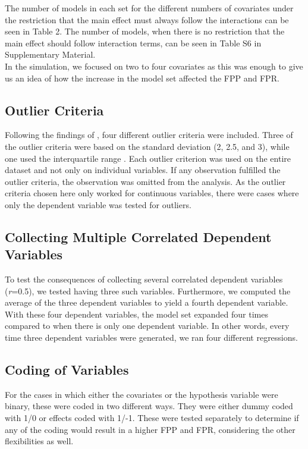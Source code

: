 The number of models in each set for the different numbers of covariates under the restriction that the main effect must always follow the interactions can be seen in Table 2. The number of models, when there is no restriction that the main effect should follow interaction terms, can be seen in Table S6 in Supplementary Material. \\



In the simulation, we focused on two to four covariates as this was enough to give us an idea of how the increase in the model set affected the FPP and FPR. 

\subsection{Outlier Criteria}
Following the findings of \cite{Leyes2013}, four different outlier criteria were included. Three of the outlier criteria were based on the standard deviation (2, 2.5, and 3), while one used the interquartile range \citep{Rousseeuw2011}. Each outlier criterion was used on the entire dataset and not only on individual variables. If any observation fulfilled the outlier criteria, the observation was omitted from the analysis. As the outlier criteria chosen here only worked for continuous variables, there were cases where only the dependent variable was tested for outliers.

\subsection{Collecting Multiple Correlated Dependent Variables}
To test the consequences of collecting several correlated dependent variables (\textit{r}=0.5), we tested having three such variables. Furthermore, we computed the average of the three dependent variables to yield a fourth dependent variable. With these four dependent variables, the model set expanded four times compared to when there is only one dependent variable. In other words, every time three dependent variables were generated, we ran four different regressions.

\subsection{Coding of Variables}
For the cases in which either the covariates or the hypothesis variable were binary, these were coded in two different ways. They were either dummy coded with 1/0 or effects coded with 1/-1. These were tested separately to determine if any of the coding would result in a higher FPP and FPR, considering the other flexibilities as well.


